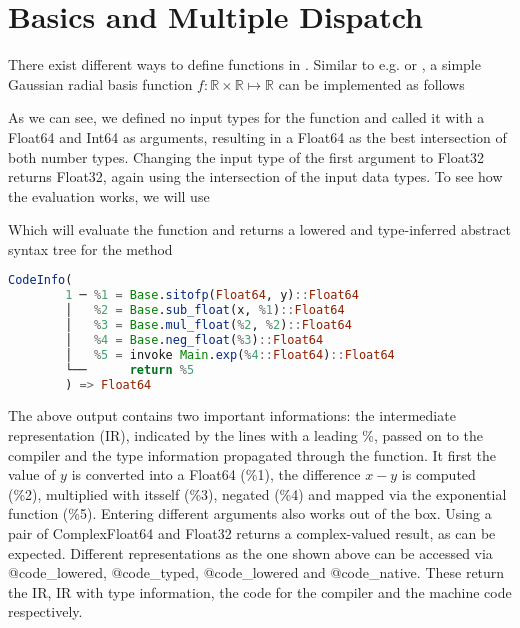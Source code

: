 \section{Basics and Multiple Dispatch}
\label{JM:sec:basics}

There exist different ways to define functions in . Similar to e.g.  or , a simple Gaussian radial basis function $f : \mathbb{R} \times \mathbb{R} \mapsto \mathbb{R}$ 
can be implemented as follows



As we can see, we defined no input types for the function and called it with a Float64 and Int64 as arguments, resulting in a Float64 as the best intersection of both number types.
Changing the input type of the first argument to Float32 returns Float32, again using the intersection of the input data types. To see how the evaluation works, we will use



Which will evaluate the function and returns a lowered and type-inferred abstract syntax tree for the method

\begin{lstlisting}[language=Julia]
    CodeInfo(
        1 ─ %1 = Base.sitofp(Float64, y)::Float64
        │   %2 = Base.sub_float(x, %1)::Float64
        │   %3 = Base.mul_float(%2, %2)::Float64
        │   %4 = Base.neg_float(%3)::Float64
        │   %5 = invoke Main.exp(%4::Float64)::Float64
        └──      return %5
        ) => Float64
\end{lstlisting}

The above output contains two important informations: the intermediate representation (IR), indicated by the lines with a leading \%, passed on to the compiler and the type information
propagated through the function. 
It first the value of $y$ is converted into a Float64 (\%1), the difference $x-y$ is computed (\%2), multiplied with itsself (\%3), negated (\%4) and mapped via the exponential function (\%5).
Entering different arguments also works out of the box. Using a pair of ComplexFloat64 and Float32 
returns a complex-valued result, as can be expected. 
Different representations as the one shown above can be accessed via {@code\_lowered}, @{code\_typed}, @{code\_lowered} and @{code\_native}. These return the IR, IR with type information, the code for the compiler and the machine code respectively.

